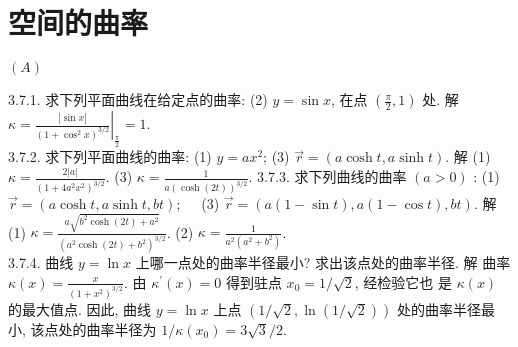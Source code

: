 \documentclass[a4paper,11pt,UTF8]{article}
\begin{document}
\section{空间的曲率}
\centerline{$(A)$}
3.7.1. 求下列平面曲线在给定点的曲率: (2) $y=\sin x$, 在点 $\left(\frac{\pi}{2}, 1\right)$ 处.
解 $\kappa=\left.\frac{|\sin x|}{\left(1+\cos ^2 x\right)^{3 / 2}}\right|_{\frac{\pi}{2}}=1$.\\
3.7.2. 求下列平面曲线的曲率:
(1) $y=a x^2$;
(3) $\vec{r}=(a \cosh t, a \sinh t)$.
解 (1) $\kappa=\frac{2|a|}{\left(1+4 a^2 x^2\right)^{3 / 2}}$. (3) $\kappa=\frac{1}{a(\cosh (2 t))^{3 / 2}}$.
3.7.3. 求下列曲线的曲率 $(a>0)$ :
(1) $\vec{r}=(a \cosh t, a \sinh t, b t) ; \quad$ (3) $\vec{r}=(a(1-\sin t), a(1-\cos t), b t)$.
解 (1) $\kappa=\frac{a \sqrt{b^2 \cosh (2 t)+a^2}}{\left(a^2 \cosh (2 t)+b^2\right)^{3 / 2}}$.
(2) $\kappa=\frac{1}{a^2\left(a^2+b^2\right)}$.\\
3.7.4. 曲线 $y=\ln x$ 上哪一点处的曲率半径最小? 求出该点处的曲率半径.
解 曲率 $\kappa(x)=\frac{x}{\left(1+x^2\right)^{3 / 2}}$. 由 $\kappa^{\prime}(x)=0$ 得到驻点 $x_0=1 / \sqrt{2}$, 经检验它也 是 $\kappa(x)$ 的最大值点. 因此, 曲线 $y=\ln x$ 上点 $(1 / \sqrt{2}, \ln (1 / \sqrt{2}))$ 处的曲率半径最小, 该点处的曲率半径为 $1 / \kappa\left(x_0\right)=3 \sqrt{3} / 2$.
\end{document}
